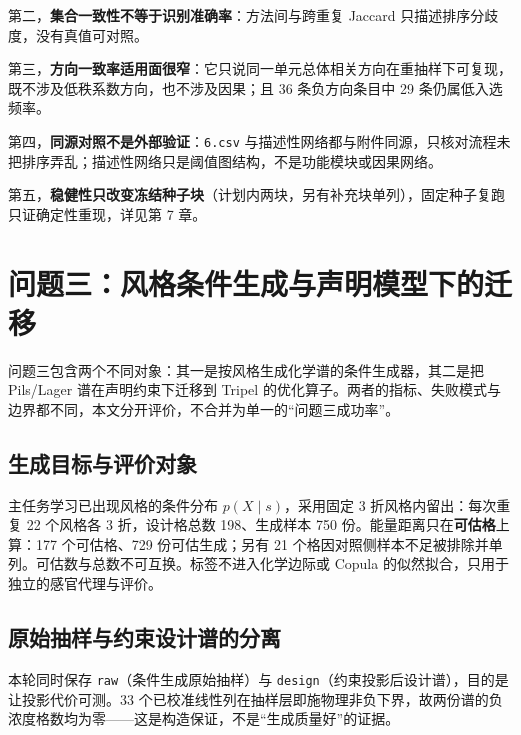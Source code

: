 \documentclass[11pt,a4paper]{article}
\begin{document}
第二，\textbf{集合一致性不等于识别准确率}：方法间与跨重复 Jaccard
只描述排序分歧度，没有真值可对照。

第三，\textbf{方向一致率适用面很窄}：它只说同一单元总体相关方向在重抽样下可复现，既不涉及低秩系数方向，也不涉及因果；且
36 条负方向条目中 29 条仍属低入选频率。

第四，\textbf{同源对照不是外部验证}：\texttt{6.csv}
与描述性网络都与附件同源，只核对流程未把排序弄乱；描述性网络只是阈值图结构，不是功能模块或因果网络。

第五，\textbf{稳健性只改变冻结种子块}（计划内两块，另有补充块单列），固定种子复跑只证确定性重现，详见第
7 章。

\section{问题三：风格条件生成与声明模型下的迁移}\label{ux95eeux9898ux4e09ux98ceux683cux6761ux4ef6ux751fux6210ux4e0eux58f0ux660eux6a21ux578bux4e0bux7684ux8fc1ux79fb}

问题三包含两个不同对象：其一是按风格生成化学谱的条件生成器，其二是把
Pils/Lager 谱在声明约束下迁移到 Tripel
的优化算子。两者的指标、失败模式与边界都不同，本文分开评价，不合并为单一的``问题三成功率''。

\subsection{生成目标与评价对象}\label{ux751fux6210ux76eeux6807ux4e0eux8bc4ux4ef7ux5bf9ux8c61}

主任务学习已出现风格的条件分布 \(p(X\mid s)\)，采用固定 3
折风格内留出：每次重复 22 个风格各 3 折，设计格总数 198、生成样本 750
份。能量距离只在\textbf{可估格}上算：177 个可估格、729 份可估生成；另有
21
个格因对照侧样本不足被排除并单列。可估数与总数不可互换。标签不进入化学边际或
Copula 的似然拟合，只用于独立的感官代理与评价。

\subsection{原始抽样与约束设计谱的分离}\label{ux539fux59cbux62bdux6837ux4e0eux7ea6ux675fux8bbeux8ba1ux8c31ux7684ux5206ux79bb}

本轮同时保存 \texttt{raw}（条件生成原始抽样）与
\texttt{design}（约束投影后设计谱），目的是让投影代价可测。33
个已校准线性列在抽样层即施物理非负下界，故两份谱的负浓度格数均为零------这是构造保证，不是``生成质量好''的证据。
\end{document}
